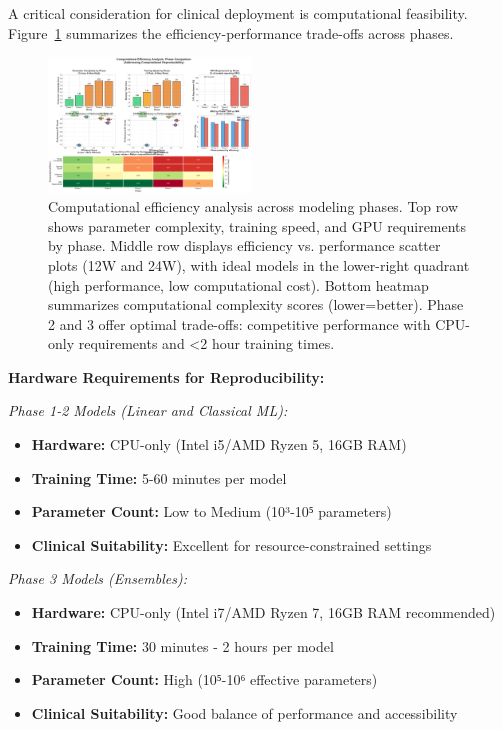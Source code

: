 \documentclass[conference]{IEEEtran}
\begin{document}
A critical consideration for clinical deployment is computational feasibility. Figure~\ref{fig:computational_efficiency} summarizes the efficiency-performance trade-offs across phases.

\begin{figure}[h]
\centering
\includegraphics[width=0.48\textwidth]{figures/computational_efficiency_analysis.png}
\caption{Computational efficiency analysis across modeling phases. Top row shows parameter complexity, training speed, and GPU requirements by phase. Middle row displays efficiency vs. performance scatter plots (12W and 24W), with ideal models in the lower-right quadrant (high performance, low computational cost). Bottom heatmap summarizes computational complexity scores (lower=better). Phase 2 and 3 offer optimal trade-offs: competitive performance with CPU-only requirements and <2 hour training times.}
\label{fig:computational_efficiency}
\end{figure}

\textbf{Hardware Requirements for Reproducibility:}

\textit{Phase 1-2 Models (Linear and Classical ML):}
\begin{itemize}
    \item \textbf{Hardware:} CPU-only (Intel i5/AMD Ryzen 5, 16GB RAM)
    \item \textbf{Training Time:} 5-60 minutes per model
    \item \textbf{Parameter Count:} Low to Medium (10³-10⁵ parameters)
    \item \textbf{Clinical Suitability:} Excellent for resource-constrained settings
\end{itemize}

\textit{Phase 3 Models (Ensembles):}
\begin{itemize}
    \item \textbf{Hardware:} CPU-only (Intel i7/AMD Ryzen 7, 16GB RAM recommended)
    \item \textbf{Training Time:} 30 minutes - 2 hours per model
    \item \textbf{Parameter Count:} High (10⁵-10⁶ effective parameters)
    \item \textbf{Clinical Suitability:} Good balance of performance and accessibility
\end{itemize}
\end{document}
